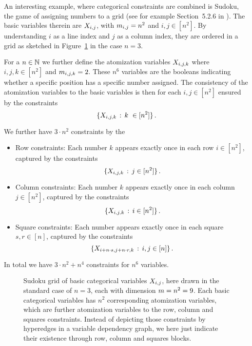 \begin{example}[Sudoku]\label{exa:sudoku}
	An interesting example, where categorical constraints are combined is Sudoku, the game of assigning numbers to a grid (see for example Section~5.2.6 in \cite{russel_artificial_2021}).
	The basic variables therein are $X_{i,j}$, with $m_{i,j}=n^2$ and $i,j\in[n^2]$.
	By understanding $i$ as a line index and $j$ as a column index, they are ordered in a grid as sketched in Figure~\ref{fig:sudokuGrid} in the case $n=3$.
		
	For a $n\in\mathbb{N}$ we further define the atomization variables $X_{i,j,k}$ where $i,j,k\in[n^2]$ and $m_{i,j,k}=2$.
	These $n^6$ variables are the booleans indicating whether a specific position has a specific number assigned.
	The consistency of the atomization variables to the basic variables is then for each $i,j\in[n^2]$ ensured by the constraints
		\[ \{\catvariableof{i,j,k} \, : \, k \in [n^2] \} \, . \]
	
	We further have $3\cdot n^2$ constraints by the
	\begin{itemize}
		\item Row constraints: Each number $k$ appears exactly once in each row $i\in[n^2]$, captured by the constraints
			\[ \{X_{i,j,k}  \, : \, j \in [n^2] \} \, . \]
		\item Column constraints: Each number $k$ appears exactly once in each column $j\in[n^2]$, captured by the constraints
			\[ \{X_{i,j,k}  \, : \, i \in [n^2] \} \, . \]
		\item Square constraints: Each number appears exactly once in each square $s,r\in[n]$, captured by the constraints
			\[ \{X_{i+n\cdot s,j+n\cdot r,k}  \, : \, i,j \in [n] \} \, . \]
	\end{itemize}
	
	In total we have $3\cdot n^2 + n^4$ constraints for $n^6$ variables.

	\begin{figure}\label{fig:sudokuGrid} 
	\begin{center}
		
	\end{center}
	\caption{
	Sudoku grid of basic categorical variables $X_{i,j}$, here drawn in the standard case of $n=3$, each with dimension $m=n^2=9$.
	Each basic categorical variables has $n^2$ corresponding atomization variables, which are further atomization variables to the row, column and squares constraints.
	Instead of depicting those constraints by hyperedges in a variable dependency graph, we here just indicate their existence through row, column and squares blocks.
	}
	\end{figure}


\end{example}



